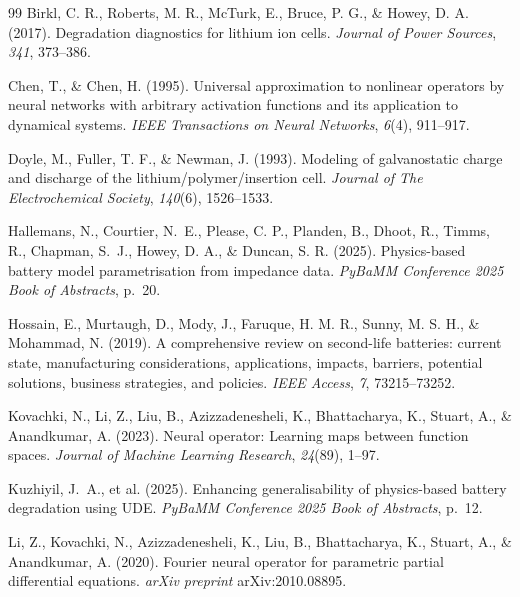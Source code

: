 \documentclass[preprint,12pt,3p,authoryear]{elsarticle}
\begin{document}

\begin{thebibliography}{99}
Birkl, C. R., Roberts, M. R., McTurk, E., Bruce, P. G., \& Howey, D. A. (2017).
Degradation diagnostics for lithium ion cells. \emph{Journal of Power
Sources}, \emph{341}, 373--386.

Chen, T., \& Chen, H. (1995). Universal approximation to nonlinear
operators by neural networks with arbitrary activation functions and its
application to dynamical systems. \emph{IEEE Transactions on Neural
Networks}, \emph{6}(4), 911--917.

Doyle, M., Fuller, T. F., \& Newman, J. (1993). Modeling of galvanostatic
charge and discharge of the lithium/polymer/insertion cell.
\emph{Journal of The Electrochemical Society}, \emph{140}(6),
1526--1533.

Hallemans, N., Courtier, N.~E., Please, C. P., Planden, B., Dhoot, R.,
Timms, R., Chapman, S.~J., Howey, D. A., \& Duncan, S. R. (2025).
Physics-based battery model parametrisation from impedance data.
\emph{PyBaMM Conference 2025 Book of Abstracts}, p.~20.

Hossain, E., Murtaugh, D., Mody, J., Faruque, H. M. R., Sunny, M. S. H.,
\& Mohammad, N. (2019). A comprehensive review on second-life batteries:
current state, manufacturing considerations, applications, impacts,
barriers, potential solutions, business strategies, and policies.
\emph{IEEE Access}, \emph{7}, 73215--73252.

Kovachki, N., Li, Z., Liu, B., Azizzadenesheli, K., Bhattacharya, K.,
Stuart, A., \& Anandkumar, A. (2023). Neural operator: Learning maps
between function spaces. \emph{Journal of Machine Learning Research},
\emph{24}(89), 1--97.

Kuzhiyil, J.~A., et al. (2025). Enhancing generalisability of
physics-based battery degradation using UDE. \emph{PyBaMM Conference
2025 Book of Abstracts}, p.~12.

Li, Z., Kovachki, N., Azizzadenesheli, K., Liu, B., Bhattacharya, K.,
Stuart, A., \& Anandkumar, A. (2020). Fourier neural operator for
parametric partial differential equations. \emph{arXiv preprint}
arXiv:2010.08895.


\end{thebibliography}
\end{document}

